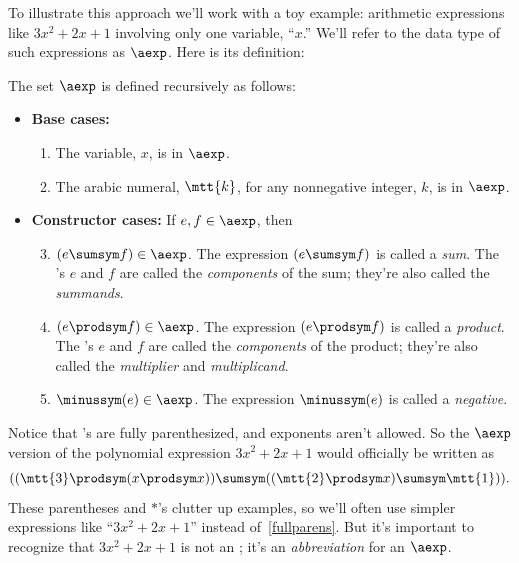 To illustrate this approach we'll work with a toy example: arithmetic
expressions like $3x^2 + 2x + 1$ involving only one variable, ``$x$.''
We'll refer to the data type of such expressions as $\aexp$.  Here is its
definition:

\begin{definition}
The set $\aexp$ is defined recursively as follows:
\begin{itemize}
\item \textbf{Base cases:}

\begin{enumerate}

\item The variable, $x$, is in $\aexp$.

\item The arabic numeral, $\mtt{k}$, for any nonnegative integer, $k$, is
  in $\aexp$.

\end{enumerate}

\item \textbf{Constructor cases:} If $e,f \in \aexp$, then
\begin{enumerate}
\setcounter{enumi}{2}

\item $(e \sumsym f) \in \aexp$.  The expression $(e \sumsym f)$ is called a
  \emph{sum}.  The \aexp's $e$ and $f$ are called the \emph{components} of
  the sum; they're also called the \emph{summands}.

\item $(e \prodsym f) \in \aexp$.  The expression $(e \prodsym f)$ is called a
  \emph{product}.  The \aexp's $e$ and $f$ are called the
  \emph{components} of the product; they're also called the
  \emph{multiplier} and \emph{multiplicand}.

\item $\minussym(e) \in \aexp$.  The expression $\minussym(e)$ is called a
  \emph{negative}.
\end{enumerate}
\end{itemize}
\end{definition}

Notice that \aexp's are fully parenthesized, and exponents aren't allowed.
So the $\aexp$ version of the polynomial expression $3x^2 + 2x + 1$ would
officially be written as
\begin{equation}\label{fullparens}
((\mtt{3} \prodsym (x \prodsym x)) \sumsym ((\mtt{2} \prodsym x) \sumsym \mtt{1})).
\end{equation}
These parentheses and $\ast$'s clutter up examples, so we'll often use
simpler expressions like ``$3x^2 + 2x + 1$'' instead
of~\eqref{fullparens}.  But it's important to recognize that $3x^2 +
2x + 1$ is not an \aexp; it's an \emph{abbreviation} for an $\aexp$.

